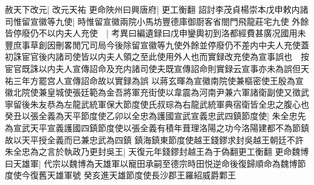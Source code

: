 赦天下改元|{
	改元天祐}
更命陜州曰興唐府|{
	更工衡翻}
詔討李茂貞楊崇本戊申敕内諸司惟留宣徽等九使|{
	時惟留宣徽兩院小馬坊豐德庫御㕑客省閤門飛龍莊宅九使}
外餘皆停廢仍不以内夫人充使　|{
	考異曰編遺録曰戊申鑾輿初到洛都經費甚廣况國用未豐庶事草創因刪畧閒冗司局今後除留宣徽等九使外餘並停廢仍不差内中夫人充使蓋初誅宦官後内諸司使皆以内夫人領之至此使用外人也而實録改充使為宣事誤也　按宦官既誅以内夫人宣傳詔命及充内諸司使夫既宣傳詔命則實録云宣事亦未為誤但天祐三年方罷宫人宣傳詔命故以實録為誤}
以蔣玄暉為宣徽南院使兼樞密使王殷為宣徽北院使兼皇城使張廷範為金吾將軍充街使以韋震為河南尹兼六軍諸衛副使又徵武寧留後朱友恭為左龍武統軍保大節度使氏叔琮為右龍武統軍典宿衛皆全忠之腹心也癸丑以張全義為天平節度使乙卯以全忠為護國宣武宣義忠武四鎮節度使|{
	朱全忠先為宣武天平宣義護國四鎮節度使以張全義有積年葺理洛陽之功今洛陽建都不為節鎮故以天平授全義而已兼忠武為四鎮}
鎮海鎮東節度使越王錢鏐求封吳越王朝廷不許朱全忠為之言於執政乃更封吳王|{
	天復元年錢鏐封越王為于偽翻更工衡翻}
更命魏博曰天雄軍|{
	代宗以魏博為天雄軍以寵田承嗣至德宗時田悦逆命後復歸順命為魏博節度使今復舊天雄軍號}
癸亥進天雄節度使長沙郡王羅紹威爵鄴王

